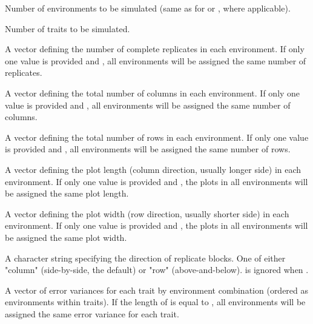\documentclass[a4paper]{book}
\begin{document}
\begin{Arguments}
\begin{ldescription}
\item[\code{n\_envs}] Number of environments to be simulated (same as for 
or , where applicable).

\item[\code{n\_traits}] Number of traits to be simulated.

\item[\code{n\_reps}] A vector defining the number of complete replicates in each environment. If only
one value is provided and , all environments will be assigned the same
number of replicates.

\item[\code{n\_cols}] A vector defining the total number of columns in each environment. If only one
value is provided and , all environments will be assigned the same number
of columns.

\item[\code{n\_rows}] A vector defining the total number of rows in each environment. If only one
value is provided and , all environments will be assigned the same number
of rows.

\item[\code{plot\_length}] A vector defining the plot length (column direction, usually longer side) in
each environment. If only one value is provided and , the plots in all
environments will be assigned the same plot length.

\item[\code{plot\_width}] A vector defining the plot width (row direction, usually shorter side) in
each environment. If only one value is provided and , the plots in all
environments will be assigned the same plot width.

\item[\code{rep\_dir}] A character string specifying the direction of replicate blocks. One of either
"column" (side-by-side, the default) or "row" (above-and-below).  is ignored
when .

\item[\code{var\_R}] A vector of error variances for each trait by environment combination (ordered
as environments within traits). If the length of  is equal to ,
all environments will be assigned the same error variance for each trait.


\end{ldescription}
\end{Arguments}
\end{document}
